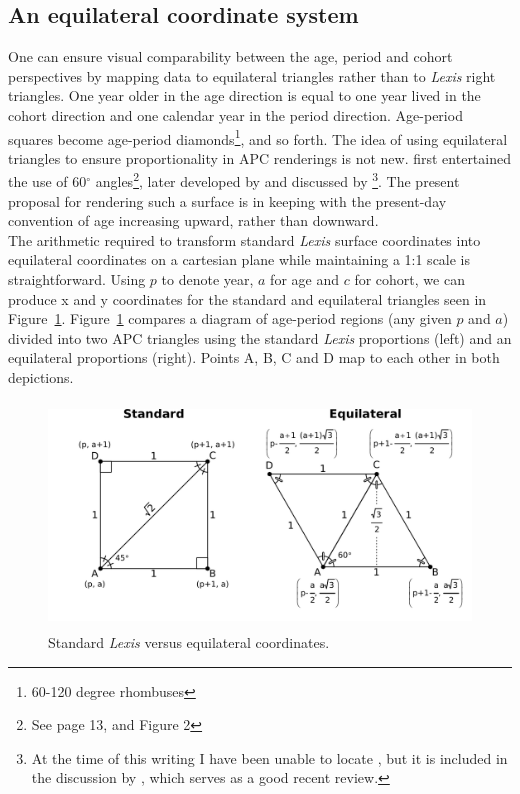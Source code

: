 \documentclass[a4paper]{article}
\begin{document}
\subsection*{An equilateral coordinate system}
One can ensure visual comparability between the age, period and cohort perspectives by mapping data to equilateral triangles rather than to \textit{Lexis} right triangles. One year older in the age direction is equal to one year lived in the cohort direction and one calendar year in the period direction. Age-period squares become age-period diamonds\footnote{60-120 degree rhombuses}, and so forth. The idea of using equilateral triangles to ensure proportionality in APC renderings is not new. \citet{lexis1875einleitung} first entertained the use of 60$^\circ$ angles\footnote{See \citet{lexis1875einleitung} page 13, and Figure 2}, later developed by \citet{lewin1876rapport} and discussed by \citet{perozzo1880della}\footnote{At the time of this writing I have been unable to locate \citet{lewin1876rapport}, but it is included in the discussion by \citet{keiding2011age}, which serves as a good recent review.}. The present proposal for rendering such a surface is in keeping with the present-day convention of age increasing upward, rather than downward.\\

The arithmetic required to transform standard \textit{Lexis} surface coordinates into equilateral coordinates on a cartesian plane while maintaining a 1:1 scale is straightforward. Using $p$ to denote year, $a$ for age and $c$ for cohort, we can produce x and y coordinates for the standard and equilateral triangles seen in Figure~\ref{Fig1}. Figure~\ref{Fig1} compares a diagram of age-period regions (any given $p$ and $a$) divided into two APC triangles using the standard \textit{Lexis} proportions (left) and an equilateral proportions (right). Points A, B, C and D map to each other in both depictions.\\

\begin{figure}[ht!]
\centering
\includegraphics[width=12cm,height=6cm]{Figs/Figure1.pdf}
\caption{Standard \textit{Lexis} versus equilateral coordinates.}
\label{Fig1}
\end{figure}
\end{document}
